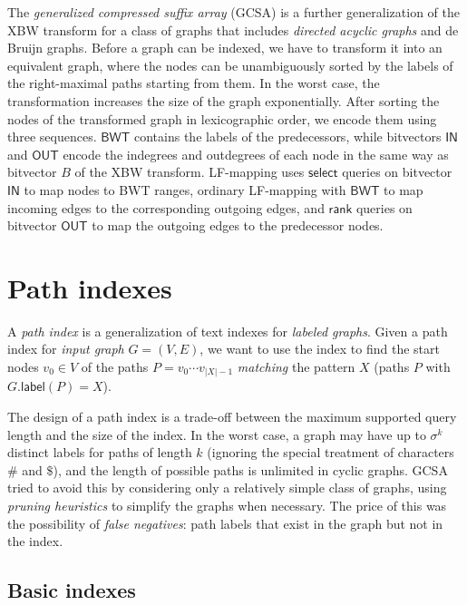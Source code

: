 \documentclass[a4paper,UKenglish]{lipics-v2016}
\newcommand{\abs}[1]{\ensuremath{\lvert #1 \rvert}}
\newcommand{\rank}{\ensuremath{\mathsf{rank}}}
\newcommand{\select}{\ensuremath{\mathsf{select}}}
\newcommand{\glabel}{\ensuremath{\mathsf{label}}}
\newcommand{\LFmapping}{LF\nobreakdash-mapping}
\newcommand{\BWT}{\ensuremath{\mathsf{BWT}}}
\newcommand{\bvIN}{\ensuremath{\mathsf{IN}}}
\newcommand{\bvOUT}{\ensuremath{\mathsf{OUT}}}
\begin{document}
The \emph{generalized compressed suffix array} (GCSA) \cite{Siren2014} is a further generalization of the XBW transform for a class of graphs that includes \emph{directed acyclic graphs} and de Bruijn graphs. Before a graph can be indexed, we have to transform it into an equivalent graph, where the nodes can be unambiguously sorted by the labels of the right-maximal paths starting from them. In the worst case, the transformation increases the size of the graph exponentially. After sorting the nodes of the transformed graph in lexicographic order, we encode them using three sequences. $\BWT$ contains the labels of the predecessors, while bitvectors $\bvIN$ and $\bvOUT$ encode the indegrees and outdegrees of each node in the same way as bitvector $B$ of the XBW transform. \LFmapping{} uses $\select$ queries on bitvector $\bvIN$ to map nodes to BWT ranges, ordinary \LFmapping{} with $\BWT$ to map incoming edges to the corresponding outgoing edges, and $\rank$ queries on bitvector $\bvOUT$ to map the outgoing edges to the predecessor nodes.


\section{Path indexes}\label{sect:path-indexes}

A \emph{path index} is a generalization of text indexes for \emph{labeled graphs}. Given a path index for \emph{input graph} $G = (V, E)$, we want to use the index to find the start nodes $v_{0} \in V$ of the paths $P = v_{0} \dotsm v_{\abs{X}-1}$ \emph{matching} the pattern $X$ (paths $P$ with $G.\glabel(P) = X$).

The design of a path index is a trade-off between the maximum supported query length and the size of the index. In the worst case, a graph may have up to $\sigma^{k}$ distinct labels for paths of length $k$ (ignoring the special treatment of characters $\#$ and $\$$), and the length of possible paths is unlimited in cyclic graphs. GCSA \cite{Siren2014} tried to avoid this by considering only a relatively simple class of graphs, using \emph{pruning heuristics} to simplify the graphs when necessary. The price of this was the possibility of \emph{false negatives}: path labels that exist in the graph but not in the index.

\subsection{Basic indexes}
\end{document}
